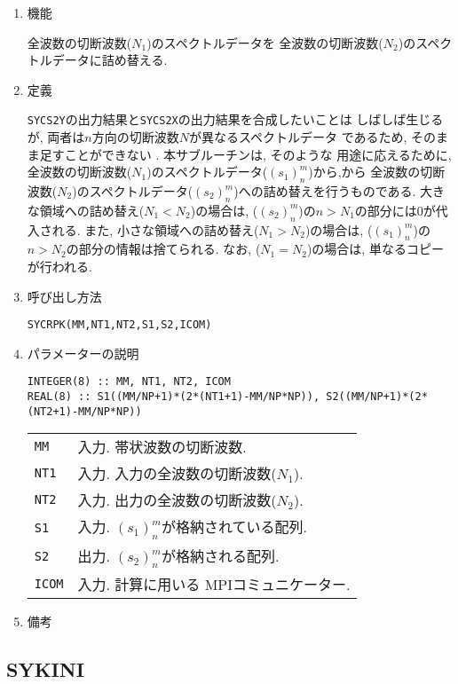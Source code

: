 \documentclass[a4j]{jsarticle}
\begin{document}
\begin{enumerate}

\item 機能

全波数の切断波数($N_1$)のスペクトルデータを
全波数の切断波数($N_2$)のスペクトルデータに詰め替える.

\item 定義

\texttt{SYCS2Y}の出力結果と\texttt{SYCS2X}の出力結果を合成したいことは
しばしば生じるが, 両者は$n$方向の切断波数$N$が異なるスペクトルデータ
であるため, そのまま足すことができない . 本サブルーチンは, そのような
用途に応えるために,
全波数の切断波数($N_1$)のスペクトルデータ($(s_1)^m_n$)から,から
全波数の切断波数($N_2$)のスペクトルデータ($(s_2)^m_n$)への詰め替えを行うものである.
大きな領域への詰め替え($N_1<N_2$)の場合は,
($(s_2)^m_n$)の$n>N_1$の部分には$0$が代入される.
また, 小さな領域への詰め替え($N_1>N_2$)の場合は,
($(s_1)^m_n$)の$n>N_2$の部分の情報は捨てられる.
なお, ($N_1=N_2$)の場合は, 単なるコピーが行われる.

\item 呼び出し方法 
    
\texttt{SYCRPK(MM,NT1,NT2,S1,S2,ICOM)}
  
\item パラメーターの説明

\begin{verbatim}
INTEGER(8) :: MM, NT1, NT2, ICOM
REAL(8) :: S1((MM/NP+1)*(2*(NT1+1)-MM/NP*NP)), S2((MM/NP+1)*(2*(NT2+1)-MM/NP*NP))
\end{verbatim}
  
\begin{tabular}{ll}
\texttt{MM} & 入力. 帯状波数の切断波数.\\  
\texttt{NT1} & 入力. 入力の全波数の切断波数($N_1$).\\
\texttt{NT2} & 入力. 出力の全波数の切断波数($N_2$).\\  
\texttt{S1} & 入力. $(s_1)^m_n$が格納されている配列.\\
\texttt{S2} & 出力. $(s_2)^m_n$が格納される配列.\\
\texttt{ICOM} & 入力. 計算に用いる MPIコミュニケーター.
\end{tabular}

\item 備考

\end{enumerate}  

\subsection{SYKINI}
\end{document}
